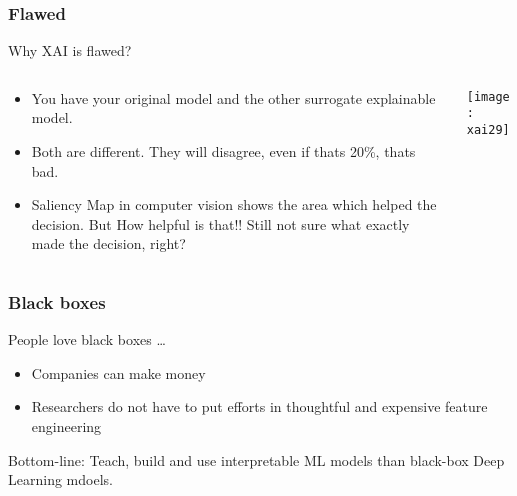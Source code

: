 \begin{frame}[fragile]\frametitle{Flawed}

Why XAI is flawed?

\begin{columns}
    \begin{column}[T]{0.6\linewidth}
		
			\begin{itemize}
			\item You have your original model and the other surrogate explainable model.
			\item Both are different. They will disagree, even if thats 20\%, thats bad.
			\item Saliency Map in computer vision shows the area which helped the decision. But How helpful is that!! Still not sure what exactly made the decision, right?
			\end{itemize}
			
    \end{column}
    \begin{column}[T]{0.4\linewidth}

      \begin{center}
      \texttt{[image: xai29]}
	  	\end{center}
    \end{column}
  \end{columns}

\end{frame}

\begin{frame}[fragile]\frametitle{Black boxes}

People love black boxes \ldots

\begin{itemize}
\item Companies can make money
\item Researchers do not have to put efforts in thoughtful and expensive feature engineering
\end{itemize}

Bottom-line: Teach, build and use interpretable ML models than black-box Deep Learning mdoels.

\end{frame}
